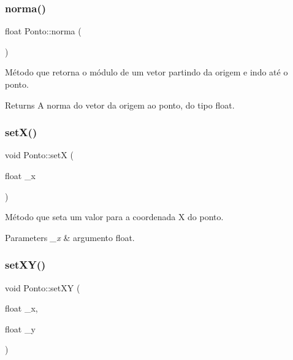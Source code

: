 \subsubsection{\texorpdfstring{norma()}{norma()}}
{\footnotesize\ttfamily float Ponto\+::norma (\begin{DoxyParamCaption}{ }\end{DoxyParamCaption})\hspace{0.3cm}{\ttfamily [inline]}}



Método que retorna o módulo de um vetor partindo da origem e indo até o ponto. 

\begin{DoxyReturn}{Returns}
A norma do vetor da origem ao ponto, do tipo float. 
\end{DoxyReturn}
\mbox{\label{classPonto_a22129ad4dbf8019c479021d70a9f6774}} 
\subsubsection{\texorpdfstring{set\+X()}{setX()}}
{\footnotesize\ttfamily void Ponto\+::setX (\begin{DoxyParamCaption}\item[{float}]{\+\_\+x }\end{DoxyParamCaption})\hspace{0.3cm}{\ttfamily [inline]}}



Método que seta um valor para a coordenada X do ponto. 


\begin{DoxyParams}{Parameters}
{\em \+\_\+x} & argumento float. \\
\hline
\end{DoxyParams}
\mbox{\label{classPonto_a827488219a7da184d440f687cec49ce6}} 
\subsubsection{\texorpdfstring{set\+X\+Y()}{setXY()}}
{\footnotesize\ttfamily void Ponto\+::set\+XY (\begin{DoxyParamCaption}\item[{float}]{\+\_\+x,  }\item[{float}]{\+\_\+y }\end{DoxyParamCaption})\hspace{0.3cm}{\ttfamily [inline]}}



